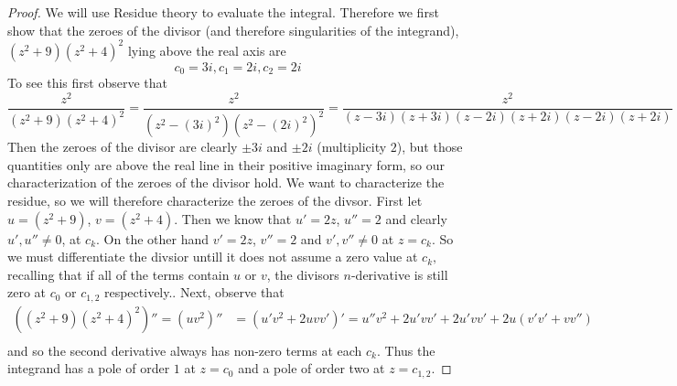 \documentclass[11pt]{amsart}
\theoremstyle{definition}
\numberwithin{theorem}{section}
\numberwithin{definition}{section}
\numberwithin{equation}{section}
\begin{document}
\begin{proof}
We will use Residue theory to evaluate the integral. Therefore we first show that the zeroes of the divisor (and therefore singularities of the integrand), $(z^2 + 9)(z^2 + 4)^2$ lying above the real axis are
	\begin{equation*}
		c_{0} =  3i, c_{1} =  2i, c_{2} = 2i
	\end{equation*}
	To see this first observe that
	\begin{equation*}
	\frac{z^2}{(z^2 + 9)(z^2 + 4)^2} = \frac{z^2}{(z^2-(3i)^2)(z^2 - (2i)^2)^2} = \frac{z^2}{(z-3i)(z+3i)(z-2i)(z+2i)(z-2i)(z+2i)}
	\end{equation*}
	Then the zeroes of the divisor are clearly $\pm 3i$ and $\pm 2i$ (multiplicity $2$), but those quantities only are above the real line
	in their positive imaginary form, so our characterization of the zeroes of the divisor hold. We want to
	characterize the residue, so we will therefore characterize the zeroes of the divsor. First let $u = (z^2 + 9)$,
	$v = (z^2 + 4).$ Then we know that $u' = 2z$, $u'' = 2$ and clearly $u', u'' \neq 0$, at $c_k$. On the other hand $v' = 2z$, $v'' = 2$ and $v' , v'' \neq 0$ at $z = c_k$. So we must differentiate the divsior untill it does not assume a zero value at $c_k,$ recalling that if all of the terms contain $u$ or $v$, the divisors $n$-derivative is still zero at $c_0$ or $c_{1,2}$ respectively..
	Next, observe that
	\begin{equation*}
	\begin{aligned}
		((z^2 + 9)(z^2 + 4)^2)'' = (uv^2)''&= (u'v^2 + 2uvv')' = u''v^2 + 2u'vv' + 2u'vv' + 2u(v'v' + vv'') \\
	\end{aligned}
	\end{equation*}
	and so the second derivative always has non-zero terms at each $c_k$. Thus the integrand has a pole of order $1$ at $z= c_0$ and a pole of order two at $z = c_{1,2}$.


\end{proof}
\end{document}
